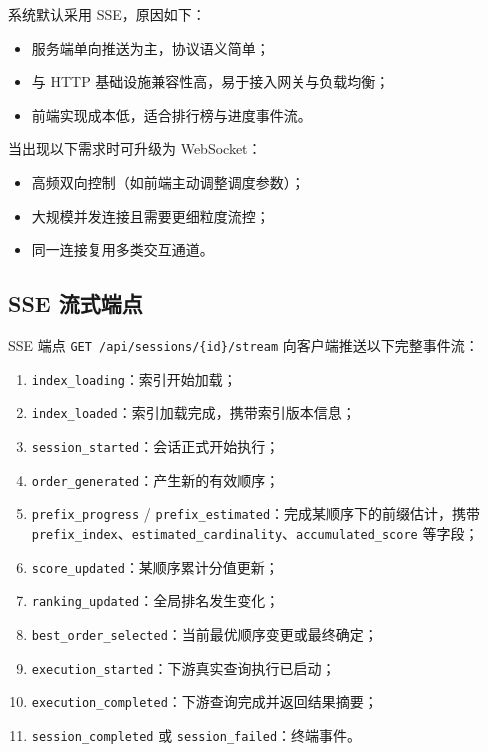 \documentclass[12pt,a4paper]{article}
\begin{document}
系统默认采用 SSE，原因如下：
\begin{itemize}
  \item 服务端单向推送为主，协议语义简单；
  \item 与 HTTP 基础设施兼容性高，易于接入网关与负载均衡；
  \item 前端实现成本低，适合排行榜与进度事件流。
\end{itemize}

当出现以下需求时可升级为 WebSocket：
\begin{itemize}
  \item 高频双向控制（如前端主动调整调度参数）；
  \item 大规模并发连接且需要更细粒度流控；
  \item 同一连接复用多类交互通道。
\end{itemize}

\subsection{SSE 流式端点}

SSE 端点 \texttt{GET /api/sessions/\{id\}/stream} 向客户端推送以下完整事件流：

\begin{enumerate}
  \item \texttt{index\_loading}：索引开始加载；
  \item \texttt{index\_loaded}：索引加载完成，携带索引版本信息；
  \item \texttt{session\_started}：会话正式开始执行；
  \item \texttt{order\_generated}：产生新的有效顺序；
  \item \texttt{prefix\_progress} / \texttt{prefix\_estimated}：完成某顺序下的前缀估计，携带
        \texttt{prefix\_index}、\texttt{estimated\_cardinality}、\texttt{accumulated\_score} 
        等字段；
  \item \texttt{score\_updated}：某顺序累计分值更新；
  \item \texttt{ranking\_updated}：全局排名发生变化；
  \item \texttt{best\_order\_selected}：当前最优顺序变更或最终确定；
  \item \texttt{execution\_started}：下游真实查询执行已启动；
  \item \texttt{execution\_completed}：下游查询完成并返回结果摘要；
  \item \texttt{session\_completed} 或 \texttt{session\_failed}：终端事件。
\end{enumerate}
\end{document}
